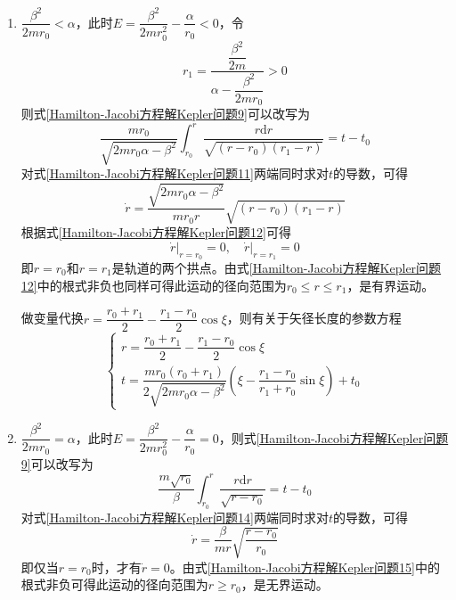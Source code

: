 \begin{enumerate}
\item $\dfrac{\beta^2}{2mr_0}<\alpha$，此时$E = \dfrac{\beta^2}{2mr_0^2}-\dfrac{\alpha}{r_0}<0$，令
\begin{equation}
	r_1 = \dfrac{\dfrac{\beta^2}{2m}}{\alpha-\dfrac{\beta^2}{2mr_0}} > 0
	\label{Hamilton-Jacobi方程解Kepler问题10}
\end{equation}
则式\eqref{Hamilton-Jacobi方程解Kepler问题9}可以改写为
\begin{equation}
	\frac{mr_0}{\sqrt{2mr_0\alpha-\beta^2}} \int_{r_0}^r \frac{r\mathrm{d}r}{\sqrt{(r-r_0)(r_1-r)}} = t-t_0
	\label{Hamilton-Jacobi方程解Kepler问题11}
\end{equation}
对式\eqref{Hamilton-Jacobi方程解Kepler问题11}两端同时求对$t$的导数，可得
\begin{equation}
	\dot{r} = \frac{\sqrt{2mr_0\alpha-\beta^2}}{mr_0r} \sqrt{(r-r_0)(r_1-r)}
	\label{Hamilton-Jacobi方程解Kepler问题12}
\end{equation}
根据式\eqref{Hamilton-Jacobi方程解Kepler问题12}可得
\begin{equation}
	\dot{r}\big|_{r=r_0} = 0,\quad \dot{r}\big|_{r=r_1} = 0
\end{equation}
即$r=r_0$和$r=r_1$是轨道的两个拱点。由式\eqref{Hamilton-Jacobi方程解Kepler问题12}中的根式非负也同样可得此运动的径向范围为$r_0\leqslant r \leqslant r_1$，是有界运动。

做变量代换$r = \dfrac{r_0+r_1}{2}-\dfrac{r_1-r_0}{2}\cos \xi$，则有关于矢径长度的参数方程
\begin{equation}
\begin{cases}
	r = \dfrac{r_0+r_1}{2}-\dfrac{r_1-r_0}{2}\cos \xi \\
	t = \dfrac{mr_0(r_0+r_1)}{2\sqrt{2mr_0\alpha-\beta^2}} \left(\xi - \dfrac{r_1-r_0}{r_1+r_0}\sin \xi\right) + t_0
\end{cases}
\label{Hamilton-Jacobi方程解Kepler问题13}
\end{equation}

\item $\dfrac{\beta^2}{2mr_0}=\alpha$，此时$E = \dfrac{\beta^2}{2mr_0^2}-\dfrac{\alpha}{r_0}=0$，则式\eqref{Hamilton-Jacobi方程解Kepler问题9}可以改写为
\begin{equation}
	\frac{m\sqrt{r_0}}{\beta} \int_{r_0}^r \frac{r\mathrm{d}r}{\sqrt{r-r_0}} = t-t_0
	\label{Hamilton-Jacobi方程解Kepler问题14}
\end{equation}
对式\eqref{Hamilton-Jacobi方程解Kepler问题14}两端同时求对$t$的导数，可得
\begin{equation}
	\dot{r} = \frac{\beta}{mr}\sqrt{\frac{r-r_0}{r_0}}
	\label{Hamilton-Jacobi方程解Kepler问题15}
\end{equation}
即仅当$r=r_0$时，才有$\dot{r} = 0$。由式\eqref{Hamilton-Jacobi方程解Kepler问题15}中的根式非负可得此运动的径向范围为$r\geqslant r_0$，是无界运动。


\end{enumerate}
